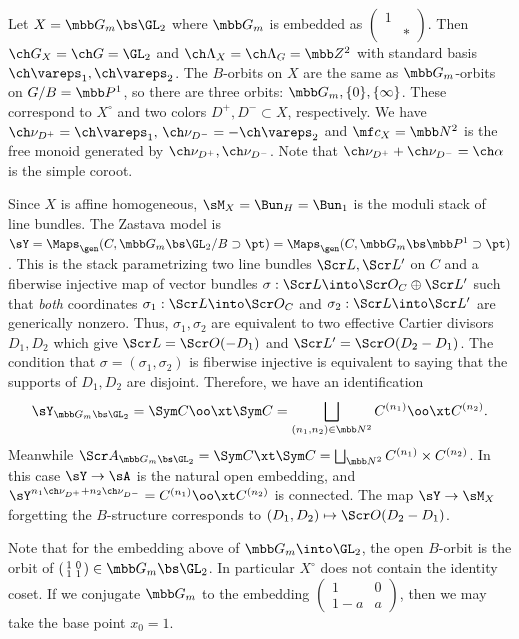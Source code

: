 \begin{eg}
\notready \label{eg:YHecke}
Let $X = \mbb G_m \bs \GL_2$ where $\mbb G_m$ is embedded as $\left( \begin{smallmatrix} 1 & \\ & * \end{smallmatrix} \right)$.
Then $\ch G_X = \ch G = \GL_2$ and $\ch\Lambda_X = \ch\Lambda_G = \mbb Z^2$ with
standard basis $\ch\vareps_1,\ch\vareps_2$.
The $B$-orbits on $X$ are the same as $\mbb G_m$-orbits on $G/B=\mbb P^1$, so
there are three orbits: $\mbb G_m, \{0\}, \{\infty\}$.
These correspond to $X^\circ$ and two colors $D^+, D^- \subset X$, respectively.
We have $\ch\nu_{D^+} = \ch\vareps_1,\, \ch\nu_{D^-} = -\ch\vareps_2$
and $\mf c_X = \mbb N^2$ is the free monoid generated by $\ch\nu_{D^+}, \ch\nu_{D^-}$.
Note that $\ch\nu_{D^+} + \ch\nu_{D^-} = \ch\alpha$ is the simple coroot.

Since $X$ is affine homogeneous, $\sM_X = \Bun_H = \Bun_1$ is the moduli stack
of line bundles. The Zastava model is $\sY=\Maps_\gen(C, \mbb G_m \bs \GL_2/B \supset \pt)
= \Maps_\gen(C, \mbb G_m \bs \mbb P^1 \supset \pt)$.
This is the stack parametrizing two line bundles $\Scr L, \Scr L'$ on $C$
and a fiberwise injective map of vector bundles $\sigma :\Scr L \into \Scr O_C \oplus \Scr L'$
such that \emph{both} coordinates $\sigma_1 : \Scr L \into \Scr O_C$ and $\sigma_2 : \Scr L \into \Scr L'$ are generically nonzero.
Thus, $\sigma_1,\sigma_2$ are equivalent to two effective Cartier divisors
$D_1, D_2$ which give $\Scr L = \Scr O(-D_1)$ and $\Scr L' = \Scr O(D_2-D_1)$.
The condition that $\sigma=(\sigma_1,\sigma_2)$ is fiberwise injective is equivalent
to saying that the supports of $D_1,D_2$ are disjoint.
Therefore, we have an identification
\[ \sY_{\mbb G_m \bs \GL_2} = \Sym C \oo\xt \Sym C = \bigsqcup_{(n_1,n_2)\in \mbb N^2} C^{(n_1)} \oo\xt C^{(n_2)}. \]
Meanwhile $\Scr A_{\mbb G_m \bs \GL_2} = \Sym C \xt \Sym C = \bigsqcup_{\mbb N^2} C^{(n_1)} \times C^{(n_2)}$.
In this case $\sY \to \sA$ is the natural open embedding, and
$\sY^{n_1\ch\nu_{D^+}+n_2\ch\nu_{D^-}} = C^{(n_1)} \oo\xt C^{(n_2)}$ is connected.
The map $\sY \to \sM_X$ forgetting the $B$-structure corresponds to
$(D_1,D_2) \mapsto \Scr O(D_2-D_1)$.

Note that for the embedding above of $\mbb G_m \into \GL_2$,
the open $B$-orbit is the orbit of $\left( \begin{smallmatrix} 1 & 0 \\ 1 & 1 \end{smallmatrix}
\right) \in \mbb G_m \bs \GL_2$. In particular $X^\circ$ does not contain the identity coset.
If we conjugate $\mbb G_m$ to the embedding $\left( \begin{smallmatrix} 1 & 0 \\ 1-a & a \end{smallmatrix}\right)$, then we may take the base point $x_0=1$.
\end{eg}

